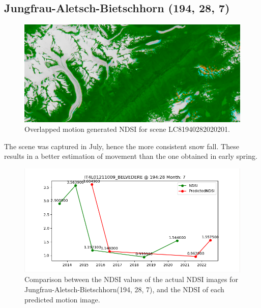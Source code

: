 \documentclass[12pt, a4paper]{report}
\begin{document}
	\newpage{}
	
	\subsection{Jungfrau-Aletsch-Bietschhorn (194, 28, 7)}
	
	\begin{figure}[h!]
		\centering
		\includegraphics[width=\linewidth]{../images/experiment_1940287_image.png}
		\caption{Overlapped motion generated NDSI for scene LC81940282020201.}
		\label{fig:experiment_1940287_image}
	\end{figure}

	The scene was captured in July, hence the more consistent snow fall. These results in a better estimation of movement than the one obtained in early spring.
	
	\begin{figure}[h!]
		\centering
		\includegraphics[scale=0.5]{../images/experiment_194287.png}
		\caption{Comparison between the NDSI values of the actual NDSI images for Jungfrau-Aletsch-Bietschhorn(194, 28, 7), and the NDSI of each predicted motion image.}
		\label{fig:jungfrau_194287}
	\end{figure}

	
\end{document}
